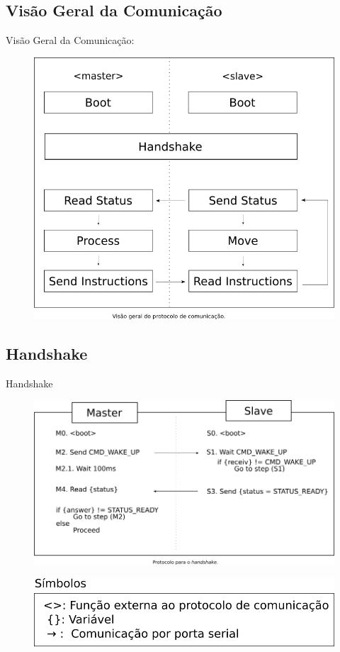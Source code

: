 \documentclass{beamer}
\begin{document}
\subsection{Visão Geral da Comunicação}
\begin{frame}
  Visão Geral da Comunicação:
    \begin{figure}
    \centering
    \includegraphics[width=0.6\linewidth]{visao-geral}
  \end{figure}
\end{frame}

\subsection{Handshake}
\begin{frame}
  \centering
  Handshake
    \begin{figure}
    \centering
    \includegraphics[width=0.5\linewidth]{handshake}
  \end{figure}
   \begin{figure}
    \centering
    \includegraphics[width=0.5\linewidth]{legenda}
  \end{figure}
\end{frame}
\end{document}
